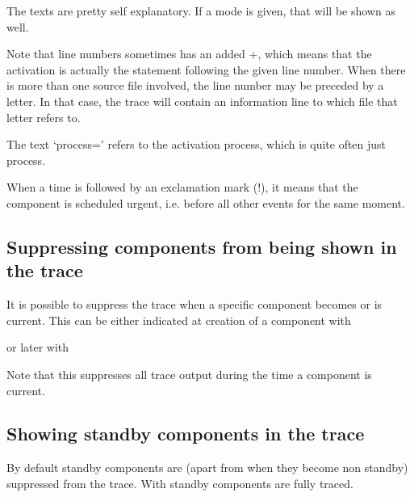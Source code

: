 \documentclass[letterpaper,10pt,english]{sphinxmanual}
\begin{document}
The texts are pretty self explanatory. If a mode is given, that will be shown as well.

Note that line numbers sometimes has an added +, which means that the activation is actually the statement following the given line number. When there is more than one source file involved, the line number may be preceded by a letter. In that case, the trace will contain an information line to which file that letter refers to.

The text ‘process=’ refers to the activation process, which is quite often just process.

When a time is followed by an exclamation mark (!), it means that the component is scheduled urgent, i.e. before all other events for the same moment.


\subsection{Suppressing components from being shown in the trace}
\label{\detokenize{Miscellaneous:suppressing-components-from-being-shown-in-the-trace}}
It is possible to suppress the trace when a specific component becomes or is current. This can be either indicated at creation of a component with

%
\begin{sphinxVerbatim}[commandchars=\\\{\}]
  
\end{sphinxVerbatim}

or later with

%
\begin{sphinxVerbatim}[commandchars=\\\{\}]
\end{sphinxVerbatim}

Note that this suppresses all trace output during the time a component is current.


\subsection{Showing standby components in the trace}
\label{\detokenize{Miscellaneous:showing-standby-components-in-the-trace}}
By default standby components are (apart from when they become non standby) suppressed from the trace. With  standby components are fully traced.
\end{document}
